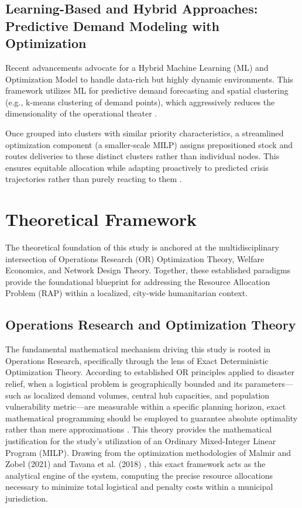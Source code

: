 \subsection{Learning-Based and Hybrid Approaches: Predictive Demand Modeling with Optimization}
Recent advancements advocate for a Hybrid Machine Learning (ML) and Optimization Model to handle data-rich but highly dynamic environments. This framework utilizes ML for predictive demand forecasting and spatial clustering (e.g., k-means clustering of demand points), which aggressively reduces the dimensionality of the operational theater \cite{fazli2021location, jiang2019emergency}.

Once grouped into clusters with similar priority characteristics, a streamlined optimization component (a smaller-scale MILP) assigns prepositioned stock and routes deliveries to these distinct clusters rather than individual nodes. This ensures equitable allocation while adapting proactively to predicted crisis trajectories rather than purely reacting to them \cite{jiang2019emergency}.

\section{Theoretical Framework}
The theoretical foundation of this study is anchored at the multidisciplinary intersection of Operations Research (OR) Optimization Theory, Welfare Economics, and Network Design Theory. Together, these established paradigms provide the foundational blueprint for addressing the Resource Allocation Problem (RAP) within a localized, city-wide humanitarian context.

\subsection{Operations Research and Optimization Theory}
The fundamental mathematical mechanism driving this study is rooted in Operations Research, specifically through the lens of Exact Deterministic Optimization Theory. According to established OR principles applied to disaster relief, when a logistical problem is geographically bounded and its parameters—such as localized demand volumes, central hub capacities, and population vulnerability metric—are measurable within a specific planning horizon, exact mathematical programming should be employed to guarantee absolute optimality rather than mere approximations \cite{van2010using}. This theory provides the mathematical justification for the study’s utilization of an Ordinary Mixed-Integer Linear Program (MILP). Drawing from the optimization methodologies of Malmir and Zobel (2021) and Tavana et al. (2018) \cite{malmir2021, tavana2018}, this exact framework acts as the analytical engine of the system, computing the precise resource allocations necessary to minimize total logistical and penalty costs within a municipal jurisdiction.


